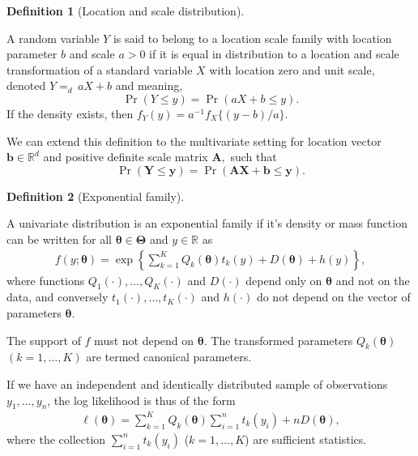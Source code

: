 \documentclass[
  11pt,
  letterpaper,
]{scrbook}
\theoremstyle{definition}
\theoremstyle{plain}
\theoremstyle{plain}
\theoremstyle{plain}
\theoremstyle{definition}
\theoremstyle{definition}
\newtheorem{definition}{Definition}[chapter]
\theoremstyle{plain}
\theoremstyle{plain}
\theoremstyle{remark}
\begin{document}
\begin{definition}[Location and scale
distribution]\protect\hypertarget{def-location-scale}{}\label{def-location-scale}

A random variable \(Y\) is said to belong to a location scale family
with location parameter \(b\) and scale \(a>0\) if it is equal in
distribution to a location and scale transformation of a standard
variable \(X\) with location zero and unit scale, denoted
\(Y {=}_d\, aX + b\) and meaning,
\[\Pr(Y \leq y) = \Pr(aX + b \leq y).\] If the density exists, then
\(f_Y(y) = a^{-1}f_X\{(y-b)/a\}.\)

We can extend this definition to the multivariate setting for location
vector \(\boldsymbol{b} \in \mathbb{R}^d\) and positive definite scale
matrix \(\mathbf{A},\) such that
\[\Pr(\boldsymbol{Y} \leq \boldsymbol{y}) = \Pr(\mathbf{A}\boldsymbol{X} + \boldsymbol{b} \leq \boldsymbol{y}).\]

\end{definition}

\begin{definition}[Exponential
family]\protect\hypertarget{def-exponential-family}{}\label{def-exponential-family}

A univariate distribution is an exponential family if it's density or
mass function can be written for all
\(\boldsymbol{\theta} \in \boldsymbol{\Theta}\) and \(y \in \mathbb{R}\)
as \begin{align*}
f(y; \boldsymbol{\theta}) = \exp\left\{ \sum_{k=1}^K Q_k(\boldsymbol{\theta}) t_k(y) + D(\boldsymbol{\theta}) + h(y)\right\}, 
\end{align*} where functions \(Q_1(\cdot), \ldots, Q_K(\cdot)\) and
\(D(\cdot)\) depend only on \(\boldsymbol{\theta}\) and not on the data,
and conversely \(t_1(\cdot), \ldots, t_K(\cdot)\) and \(h(\cdot)\) do
not depend on the vector of parameters \(\boldsymbol{\theta}.\)

The support of \(f\) must not depend on \(\boldsymbol{\theta}.\) The
transformed parameters \(Q_k(\boldsymbol{\theta})\) \((k=1, \ldots, K)\)
are termed canonical parameters.

\end{definition}

If we have an independent and identically distributed sample of
observations \(y_1, \ldots, y_n\), the log likelihood is thus of the
form \begin{align*}
\ell(\boldsymbol{\theta}) = \sum_{k=1}^K Q_k(\boldsymbol{\theta}) \sum_{i=1}^n t_k(y_i) + n D(\boldsymbol{\theta}),
\end{align*} where the collection \(\sum_{i=1}^n t_k(y_i)\)
(\(k=1, \ldots, K\)) are sufficient statistics.
\end{document}
